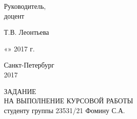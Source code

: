 \documentclass[a4paper, 12pt]{article}
\begin{document}
\noindent Руководитель,\\
доцент\hfill
\begin{minipage}{0.7\textwidth}
    \hfill \uline{\hspace{3cm}} \hspace{0.5cm} Т.В. Леонтьева
\end{minipage}

\vspace{3ex}

\hfill \begin{minipage}{0.6\textwidth} \hfill «\uline{\hspace{1cm}}»\uline{\hspace{3cm}} 2017 г.\end{minipage}

\vfill

\begin{center}
    Санкт-Петербург\\
    2017
\end{center}

\newpage
\thispagestyle{empty}
\begin{center}
    ЗАДАНИЕ\\
    НА ВЫПОЛНЕНИЕ КУРСОВОЙ РАБОТЫ \\[1ex]
    студенту группы 23531/21 Фомину С.А.
\end{center}

\vspace{0.5cm}
\end{document}
